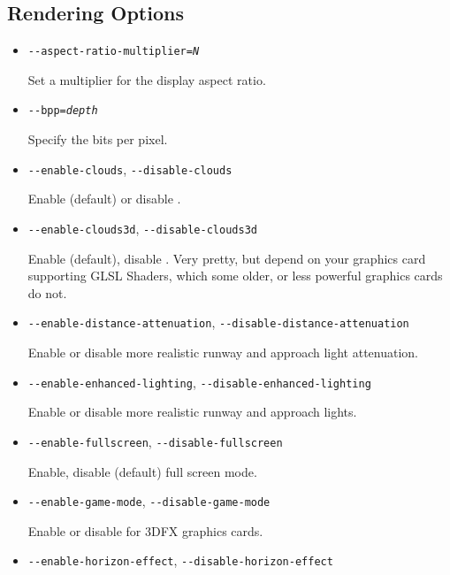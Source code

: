 \subsection{Rendering Options}
\begin{itemize}

\item{\texttt{-$ $-aspect-ratio-multiplier={\it N}}}

Set a multiplier for the display aspect ratio.

\item{\texttt{-$ $-bpp={\it depth}}}

Specify the bits per pixel.


\item{\texttt{-$ $-enable-clouds}, \texttt{-$ $-disable-clouds}}

Enable (default) or disable .

\item{\texttt{-$ $-enable-clouds3d}, \texttt{-$ $-disable-clouds3d}}

Enable (default), disable . Very pretty, but depend on your graphics card supporting
GLSL Shaders, which some older, or less powerful graphics cards do not.

\item{\texttt{-$ $-enable-distance-attenuation}, \texttt{-$ $-disable-distance-attenuation}}

Enable or disable more realistic runway and approach light attenuation.

\item{\texttt{-$ $-enable-enhanced-lighting}, \texttt{-$ $-disable-enhanced-lighting}}

Enable or disable more realistic runway and approach lights.

\item{\texttt{-$ $-enable-fullscreen}, \texttt{-$ $-disable-fullscreen}}

Enable, disable (default) full screen mode.

\item{\texttt{-$ $-enable-game-mode}, \texttt{-$ $-disable-game-mode}}

Enable or disable  for 3DFX graphics cards.

\item{\texttt{-$ $-enable-horizon-effect}, \texttt{-$ $-disable-horizon-effect}}


\end{itemize}
